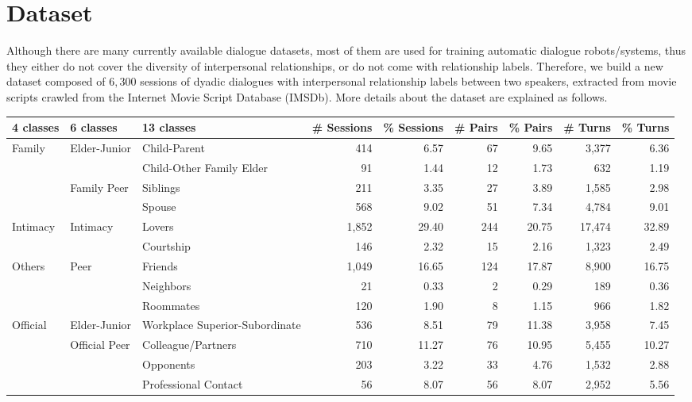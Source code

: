 \section{Dataset}
\label{sec:dataset}
Although there are many currently available dialogue datasets, 
most of them are used for training automatic dialogue robots/systems, 
thus they either do not cover the diversity of interpersonal relationships, 
or do not come with relationship labels.
Therefore, we build a new dataset 
composed of $6,300$ sessions of dyadic dialogues with 
interpersonal relationship labels between two speakers, 
extracted from movie scripts crawled from 
the Internet Movie Script Database (IMSDb). More details about the dataset are explained as follows.

\begin{table*}[t]
	\centering
	\small
	\begin{tabular}{@{}lllrrrrrr@{}}
		\toprule[1.5pt]
		\textbf{4 classes} & \textbf{6 classes} & \textbf{13 classes}  & \textbf{\# Sessions} & \textbf{\% Sessions}& \textbf{\# Pairs} & \textbf{\% Pairs} & \textbf{\# Turns} & \textbf{\% Turns}  \\ 
		\hline
		\multirow{4}{*}{Family}&\multirow{2}{*}{Elder-Junior} & Child-Parent   &  414    &   6.57   &  67   &	9.65	&  3,377 & 6.36   \\
		& & Child-Other Family Elder 															    &   91   &  1.44    &  12   &	1.73	&   632  & 1.19  \\
		& \multirow{2}{*}{Family Peer} & Siblings 														  &   211   &   3.35   &  27   &   3.89	&   1,585  & 2.98 \\
		& & Spouse 																						   &   568   &   9.02   &  51   &	 7.34  &   4,784  & 9.01 \\
		\hline
		\multirow{2}{*}{Intimacy}& \multirow{2}{*}{Intimacy} &  Lovers					&  1,852    &  29.40    &  244   &20.75	&   17,474 & 32.89  \\
		& & Courtship	
		&  146    &   2.32   &  15   & 2.16	&  1,323 & 2.49   \\
		\hline
		\multirow{3}{*}{Others}& \multirow{3}{*}{Peer} & Friends 					&  1,049    & 16.65     &  124   &17.87	&  8,900 & 16.75    \\
		& &Neighbors 																					 &   21   &  0.33    &  2   &	0.29& 189 & 0.36      \\
		& &Roommates 																				    &  120    &   1.90   &  8   & 1.15	&   966 & 1.82   \\
		
		
		\hline
		\multirow{4}{*}{Official}& \multirow{1}{*}{Elder-Junior} &Workplace Superior-Subordinate &  536    &   8.51   &  79   &	11.38& 3,958 & 7.45     \\
		&\multirow{3}{*}{Official Peer} &Colleague/Partners										&   710   &  11.27    &  76   &	10.95 & 5,455 & 10.27     \\
		& &Opponents																				  &  203   &  3.22    &  33   &  4.76	&  1,532 & 2.88   \\
		& &Professional Contact																	  &   56   &  8.07    &  56   &	8.07 & 2,952 & 5.56     \\
		

\end{tabular}
\end{table*}
